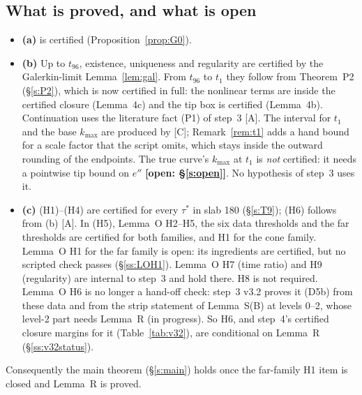 \documentclass[11pt]{article}
\theoremstyle{definition}
\theoremstyle{remark}
\newcommand{\fn}[1]{\texttt{\detokenize{#1}}}
\newcommand{\tC}{\textnormal{\textsc{[C]}}}
\newcommand{\tA}{\textnormal{\textsc{[A]}}}
\newcommand{\OPEN}[1]{\textcolor{red!75!black}{\textbf{\textsf{[open: #1]}}}}
\begin{document}
\subsection{What is proved, and what is open}\label{ss:status}
\begin{itemize}
\item \textbf{(a)} is certified (Proposition~\ref{prop:G0}).
\item \textbf{(b)} Up to $t_{96}$, existence, uniqueness and regularity are certified by the Galerkin-limit Lemma~\ref{lem:gal}. From $t_{96}$ to $t_1$ they follow from Theorem~P2 (\S\ref{s:P2}), which is now certified in full: the nonlinear terms are inside the certified closure (Lemma~4c) and the tip box is certified (Lemma~4b). Continuation uses the literature fact (P1) of step~3 \tA. The interval for $t_1$ and the base $k_{\max}$ are produced by \fn{t1clock.py} \tC; Remark~\ref{rem:t1} adds a hand bound for a scale factor that the script omits, which stays inside the outward rounding of the endpoints. The true curve's $k_{\max}$ at $t_1$ is \emph{not} certified: it needs a pointwise tip bound on $e''$ \OPEN{\S\ref{s:open}}. No hypothesis of step~3 uses it.
\item \textbf{(c)} (H1)--(H4) are certified for every $\tau^*$ in slab 180 (\S\ref{s:T9}); (H6) follows from (b) \tA. In (H5), Lemma~O H2--H5, the six data thresholds and the far thresholds are certified for both families, and H1 for the cone family. Lemma~O H1 for the far family is open: its ingredients are certified, but no scripted check passes (\S\ref{ss:LOH1}). Lemma~O H7 (time ratio) and H9 (regularity) are internal to step~3 and hold there. H8 is not required. Lemma~O H6 is no longer a hand-off check: step~3 v3.2 proves it (D5b) from these data and from the strip statement of Lemma~S(B) at levels 0--2, whose level-2 part needs Lemma~R (in progress). So H6, and step~4's certified closure margins for it (Table~\ref{tab:v32}), are conditional on Lemma~R (\S\ref{ss:v32status}).
\end{itemize}
Consequently the main theorem (\S\ref{s:main}) holds once the far-family H1 item is closed and Lemma~R is proved.
\end{document}
